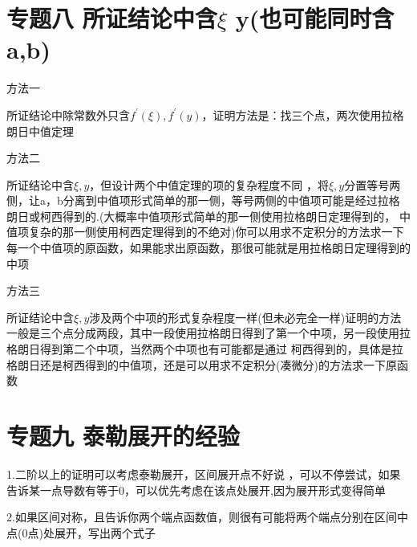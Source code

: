 \documentclass[a4paper,11pt]{book}
\begin{document}
\section*{专题八 \quad 所证结论中含$\xi$ y(也可能同时含a,b)}

方法一

所证结论中除常数外只含$f^{\prime}(\xi ),f^{\prime}(y)$，证明方法是：找三个点，两次使用拉格朗日中值定理

\noindent 方法二

所证结论中含$\xi,y$，但设计两个中值定理的项的复杂程度不同
，将$\xi,y$分置等号两侧，让a，b分离到中值项形式简单的那一侧，等号两侧的中值项可能是经过拉格朗日或柯西得到的.(大概率中值项形式简单的那一侧使用拉格朗日定理得到的，
中值项复杂的那一侧使用柯西定理得到的不绝对)你可以用求不定积分的方法求一下每一个中值项的原函数，如果能求出原函数，那很可能就是用拉格朗日定理得到的中项

\noindent 方法三

所证结论中含$\xi, y$涉及两个中项的形式复杂程度一样(但未必完全一样)证明的方法一般是三个点分成两段，其中一段使用拉格朗日得到了第一个中项，另一段使用拉格朗日得到第二个中项，当然两个中项也有可能都是通过
柯西得到的，具体是拉格朗日还是柯西得到的中值项，还是可以用求不定积分(凑微分)的方法求一下原函数

\section*{专题九 \quad 泰勒展开的经验}

1.二阶以上的证明可以考虑泰勒展开，区间展开点不好说
，可以不停尝试，如果告诉某一点导数有等于0，可以优先考虑在该点处展开,因为展开形式变得简单

\noindent 2.如果区间对称，且告诉你两个端点函数值，则很有可能将两个端点分别在区间中点(0点)处展开，写出两个式子
\end{document}
